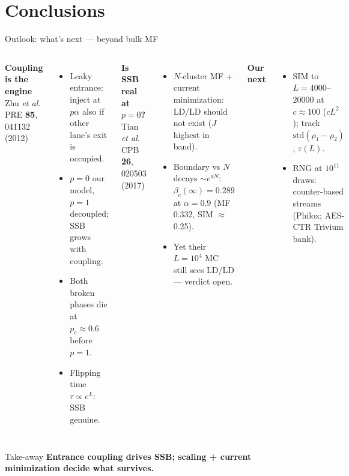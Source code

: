 \documentclass[aspectratio=169,10pt]{beamer}
\newcommand{\pos}[1]{\textcolor{positive}{#1}}
\newcommand{\con}[1]{\textcolor{negative}{#1}}
\newcommand{\HL}[1]{\textcolor{emphasis}{#1}}
\begin{document}
\section{Conclusions}
\begin{frame}{Outlook: what's next — beyond bulk MF}
  \vspace{-0.4em}
  \begin{columns}[T]
      \textbf{\pos{Coupling is the engine}}\\{\small Zhu \textit{et al.} PRE \textbf{85}, 041132 (2012)}
      \begin{itemize}
        \item Leaky entrance: inject at $p\alpha$ also if other lane's exit is occupied.
        \item $p{=}0$ our model, $p{=}1$ decoupled; SSB grows with coupling.
        \item \pos{Both broken phases die at $p_c\approx0.6$} before $p{=}1$.
        \item {\small Flipping time $\tau\propto e^{L}$: SSB genuine.}
      \end{itemize}
      \textbf{\HL{Is SSB real at $p{=}0$?}}\\{\small Tian \textit{et al.} CPB \textbf{26}, 020503 (2017)}
      \begin{itemize}
        \item $N$-cluster MF + current minimization: \con{LD/LD should not exist} ($J$ highest in band).
        \item Boundary vs $N$ decays $\sim e^{aN}$: $\beta_c(\infty)\!=\!0.289$ at $\alpha\!=\!0.9$ (MF 0.332, SIM $\approx$0.25).
        \item {\small Yet their $L{=}10^4$ MC still sees LD/LD --- verdict open.}
      \end{itemize}
      \textbf{Our next}
      \begin{itemize}
        \item SIM to $L=4000$--$20000$ at $c\approx100$ ($cL^2$); track $\mathrm{std}(\rho_1{-}\rho_2)$, $\tau(L)$.
        \item RNG at $10^{11}$ draws: counter-based streams (Philox; AES-CTR Trivium bank).
      \end{itemize}
  \end{columns}
  \begin{block}{Take-away}
    \small\textbf{Entrance coupling drives SSB; scaling + current minimization decide what survives.}

\end{block}
\end{frame}
\end{document}
